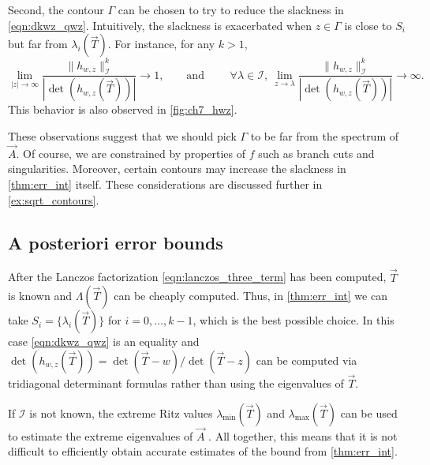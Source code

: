 Second, the contour \( \Gamma \) can be chosen to try to reduce the slackness in \cref{eqn:dkwz_qwz}.
Intuitively, the slackness is exacerbated when \( z \in \Gamma \) is close to \( S_i \) but far from \( \lambda_i(\vec{T}) \).
For instance, for any \( k>1 \),
\begin{equation*}
\lim_{|z|\to\infty} \frac{\|h_{w,z}\|_{\mathcal{I}}^k}{|\det(h_{w,z}(\vec{T}))|} \to 1 
,\qquad\text{and }\qquad
\forall \lambda \in \mathcal{I},~ \lim_{z\to\lambda} \frac{\|h_{w,z}\|_{\mathcal{I}}^k}{|\!\det(h_{w,z}(\vec{T}))|} \to \infty.
\end{equation*}
This behavior is also observed in \cref{fig:ch7_hwz}.

These observations suggest that we should pick \( \Gamma \) to be far from the spectrum of \( \vec{A} \).
Of course, we are constrained by properties of \( f \) such as branch cuts and singularities.
Moreover, certain contours may increase the slackness in \cref{thm:err_int} itself. 
These considerations are discussed further in \cref{ex:sqrt_contours}.


\subsection{A posteriori error bounds}

After the Lanczos factorization \cref{eqn:lanczos_three_term} has been computed, \( \vec{T} \) is known and \( \Lambda(\vec{T}) \) can be cheaply computed. 
Thus, in \cref{thm:err_int} we can take \( S_i = \{ \lambda_i(\vec{T}) \} \) for \( i =0,\ldots,k-1 \), which is the best possible choice. 
In this case \cref{eqn:dkwz_qwz} is an equality and \( \det(h_{w,z}(\vec{T})) = \det(\vec{T}-w)/\det(\vec{T}-z) \) can be computed via tridiagonal determinant formulas rather than using the eigenvalues of \( \vec{T} \).

If \( \mathcal{I} \) is not known, the extreme Ritz values \( \lambda_{\text{min}}(\vec{T}) \) and \( \lambda_{\text{max}}(\vec{T}) \) can be used to estimate the extreme eigenvalues of \( \vec{A} \) \cite{kuczyski_wozniakowski_92,parlett_simon_stringer_82}.
All together, this means that it is not difficult to efficiently obtain accurate estimates of the bound from \cref{thm:err_int}.




